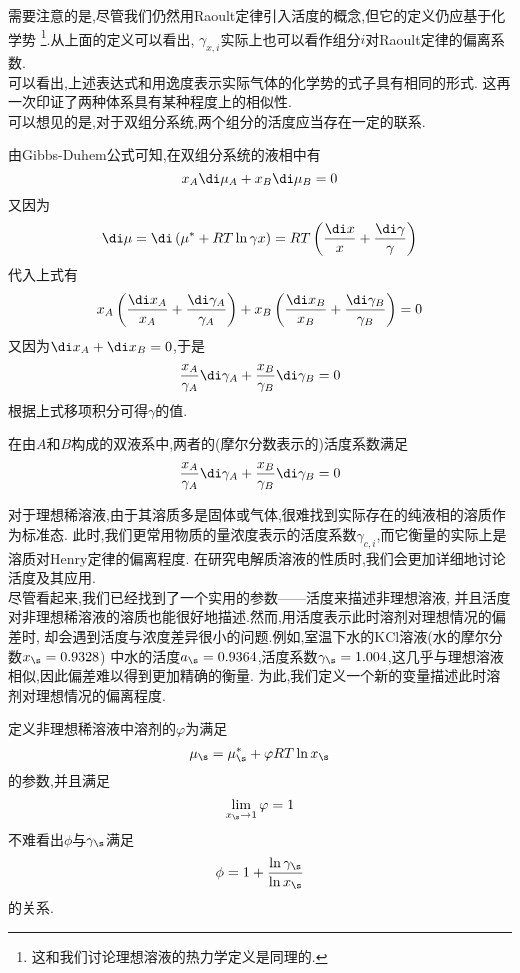 \documentclass{ctexart}
\begin{document}
需要注意的是,尽管我们仍然用Raoult定律引入活度的概念,但它的定义仍应基于化学势%
\footnote{这和我们讨论理想溶液的热力学定义是同理的.}.从上面的定义可以看出,%
$\gamma_{x,i}$实际上也可以看作组分$i$对Raoult定律的偏离系数.\\
\indent 可以看出,上述表达式和用逸度表示实际气体的化学势的式子具有相同的形式.%
这再一次印证了两种体系具有某种程度上的相似性.\\
\indent 可以想见的是,对于双组分系统,两个组分的活度应当存在一定的联系.
\begin{derivation}
    由Gibbs-Duhem公式可知,在双组分系统的液相中有
    \[x_A\di\mu_A+x_B\di\mu_B=0\]
    又因为
    \[\di\mu=\di\left(\mu^\ast+RT\ln\gamma x\right)=RT\left(\dfrac{\di x}{x}+\dfrac{\di\gamma}{\gamma}\right)\]
    代入上式有
    \[x_A\left(\dfrac{\di x_A}{x_A}+\dfrac{\di\gamma_A}{\gamma_A}\right)+
    x_B\left(\dfrac{\di x_B}{x_B}+\dfrac{\di\gamma_B}{\gamma_B}\right)=0\]
    又因为$\di x_A+\di x_B=0$,于是
    \[\dfrac{x_A}{\gamma_A}\di\gamma_A+\dfrac{x_B}{\gamma_B}\di\gamma_B=0\]
    根据上式移项积分可得$\gamma$的值.
\end{derivation}
\begin{theorem}[4C.5.2 双组分系统中活度的关系]
    在由$A$和$B$构成的双液系中,两者的(摩尔分数表示的)活度系数满足
    \[\dfrac{x_A}{\gamma_A}\di\gamma_A+\dfrac{x_B}{\gamma_B}\di\gamma_B=0\]

\end{theorem}
\indent 对于理想稀溶液,由于其溶质多是固体或气体,很难找到实际存在的纯液相的溶质作为标准态.%
此时,我们更常用物质的量浓度表示的活度系数$\gamma_{c,i}$,而它衡量的实际上是溶质对Henry定律的偏离程度.%
在研究电解质溶液的性质时,我们会更加详细地讨论活度及其应用.\vspace{4pt}\\
\indent 尽管看起来,我们已经找到了一个实用的参数——活度来描述非理想溶液,%
并且活度对非理想稀溶液的溶质也能很好地描述.然而,用活度表示此时溶剂对理想情况的偏差时,%
却会遇到活度与浓度差异很小的问题.例如,室温下水的$\text{KCl}$溶液(水的摩尔分数$x_\s=0.9328$)%
中水的活度$a_\s=0.9364$,活度系数$\gamma_\s=1.004$,这几乎与理想溶液相似,因此偏差难以得到更加精确的衡量.%
为此,我们定义一个新的变量描述此时溶剂对理想情况的偏离程度.
\begin{definition}[4C.5.3 渗透因子]
    定义非理想稀溶液中溶剂的$\varphi$为满足
    \[\mu_\s=\mu_{\s}^\ast+\varphi RT\ln x_\s\]
    的参数,并且满足
    \[\lim_{x_\s\to1}\varphi=1\]
    不难看出$\phi$与$\gamma_\s$满足
    \[\phi=1+\dfrac{\ln\gamma_\s}{\ln x_\s}\]
    的关系.
\end{definition}
\end{document}
